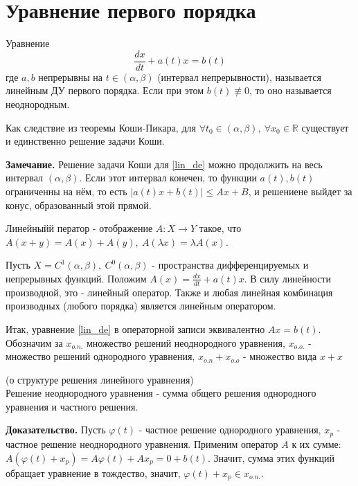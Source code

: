 \section{Уравнение первого порядка}
\begin{defin}
Уравнение 
\begin{equation}\label{lin_de}
    \frac{dx}{dt}+a(t)x=b(t)
\end{equation}
где $a,b$ непрерывны на  $t\in (\alpha,\beta)$ (интервал непрерывности),
называется линейным ДУ первого порядка. Если при этом $b(t)\not\equiv 0$, то 
оно называется неоднородным.
\end{defin}
Как следствие из теоремы Коши-Пикара, для $\forall t_0\in (\alpha,\beta),~
\forall x_0\in \mathbb{R}$ существует и единственно решение задачи Коши.

\textbf{Замечание.} Решение задачи Коши для \ref{lin_de} можно продолжить
на весь интервал $(\alpha,\beta)$. Если этот интервал конечен, то функции
$a(t),b(t)$ ограниченны на нём, то есть  $|a(t)x+b(t)|\leqslant Ax+B$, 
и решениене выйдет за конус, образованный этой прямой. 

\begin{defin}
Линейныйй ператор - отображение $A\colon X\to Y$ %
такое, что $A(x+y)=A(x)+A(y),~A(\lambda x)=\lambda A(x)$.
\end{defin}
Пусть $X=C^1(\alpha,\beta),~C^0(\alpha,\beta)$ - пространства дифференцируемых
и непрерывных функций. Положим $A(x)=\frac{dx}{dt}+a(t)x$. В силу линейности
производной, это - линейный оператор. Также и любая линейная комбинация 
производных (любого порядка) является линейным оператором. 

Итак, уравнение \ref{lin_de} в операторной записи эквивалентно 
$Ax=b(t)$. Обозначим за $x_{o.n.}$ множество решений неоднородного уравнения,
$x_{o.o.}$ - множество решений однородного уравнения,  $x_{o.n}+x_{o.o}$ -
множество вида $x+x$

\begin{theor}
    (о структуре решения линейного уравнения)\\
    Решение неоднородного уравнения - сумма общего решения однородного 
    уравнения и частного решения.
\end{theor}
\textbf{Доказательство.} Пусть $\varphi(t)$ - частное решение однородного
уравнения, $x_{p}$ - частное решение неоднородного уравнения. Применим
оператор  $A$ к их сумме:  $A(\varphi(t)+x_p)=A\varphi(t)+Ax_p=0+b(t)$. 
Значит, сумма этих функций обращает уравнение в тождество, значит,
$\varphi(t)+x_p\in x_{o.n.}$.

